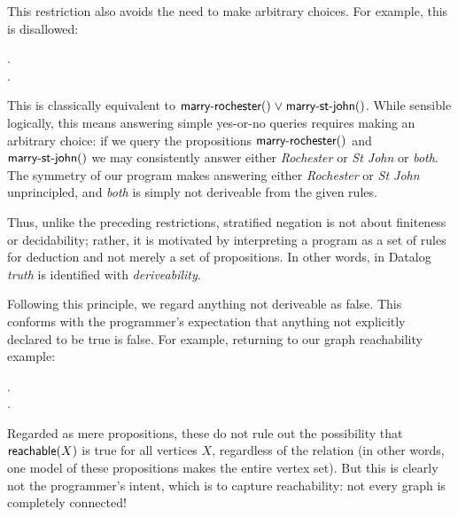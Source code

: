 This restriction also avoids the need to make arbitrary choices. For example,
this is disallowed:

\nopagebreak[1]
\begin{datalog}
   \gets \neg {}.\\
   \gets \neg {}.
\end{datalog}

\noindent
This is classically equivalent to $\atom{marry-rochester}{} \vee
\atom{marry-st-john}{}$. While sensible logically, this means answering simple
yes-or-no queries requires making an arbitrary choice: if we query the
propositions $\text{\sffamily marry-rochester}({})$ and $\text{\sffamily marry-st-john}({})$ we
may consistently answer either \emph{Rochester} or \emph{St John} or
\emph{both}.
%
The symmetry of our program makes answering either
\emph{Rochester} or \emph{St John} unprincipled, and \emph{both} is simply
not deriveable from the given rules.%
%

Thus, unlike the preceding restrictions, stratified negation is not about
finiteness or decidability; rather, it is motivated by interpreting a program
as a set of rules for deduction and not merely a set of propositions. In other
words, in Datalog \emph{truth} is identified with \emph{deriveability}.

Following this principle, we regard anything not deriveable as false. This
conforms with the programmer's expectation that anything not explicitly declared
to be true is false. For example, returning to our graph reachability example:

\nopagebreak[2]
\begin{datalog}
   \gets {} \conj {}.\\
  .
\end{datalog}


\noindent
Regarded as mere propositions, these do not rule out the possibility that
$\text{\sffamily reachable}({X})$ is true for all vertices $X$, regardless of the
 relation (in other words, one model of these propositions makes
 the entire vertex set). But this is clearly not the
programmer's intent, which is to capture reachability: not every graph is
completely connected!

